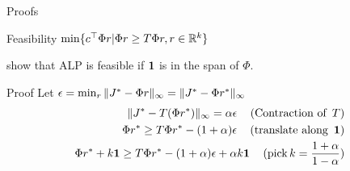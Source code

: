\documentclass[10pt,handout]{beamer}
\begin{document}
\begin{frame}[fragile]{Proofs}
\begin{block}{Feasibility}
$\min\{ c^\top \Phi r | \Phi r\geq T \Phi r, r\in \mathbb{R}^k\}$
\end{block}
\cite{de2003linear} show that ALP is feasible if $\mathbf{1}$ is in the span of $\Phi$.
\begin{block}{Proof}
Let $\epsilon=\min_r \|J^*-\Phi r\|_\infty=\|J^*-\Phi r^*\|_\infty$
\begin{align*}
\|J^*-T (\Phi r^*)\|_\infty=\alpha \epsilon\,\quad(\text{Contraction~of~}\,T)\\
\Phi r^* \geq T \Phi r^* -(1+\alpha)\epsilon\,\quad(\text{translate~along~}\,\mathbf{1})\\
\Phi r^* + k\mathbf{1}\geq T \Phi r^* -(1+\alpha)\epsilon +\alpha k\mathbf{1}\,\quad(\text{pick}\,k=\frac{1+\alpha}{1-\alpha})\\
\end{align*}
\end{block}
\end{frame}
\end{document}
